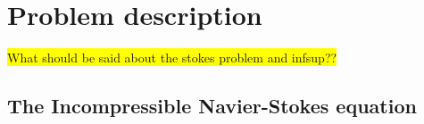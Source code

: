 
\chapter{Problem description} %

\label{description} %


\colorbox{yellow}{What should be said about the stokes problem and infsup??}
\section{The Incompressible Navier-Stokes equation}

